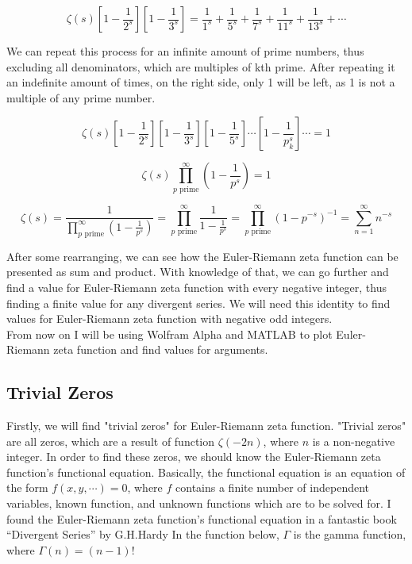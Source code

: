 \documentclass[a4paper]{article}
\begin{document}
\begin{equation*}
  \zeta(s)[1-\frac{1}{2^s}][1-\frac{1}{3^s}] = \frac{1}{1^s}+\frac{1}{5^s}+\frac{1}{7^s}+
  \frac{1}{11^s}+\frac{1}{13^s}+\cdots
  \end{equation*}

We can repeat this process for an infinite amount of prime numbers, thus
excluding all denominators, which are multiples of kth prime. After repeating it
an indefinite amount of times, on the right side, only 1 will be left, as 1 is
not a multiple of any prime number. 

\begin{equation*}
  \zeta(s)[1-\frac{1}{2^s}][1-\frac{1}{3^s}][1-\frac{1}{5^s}]\cdots[1-\frac{1}{p_k^s}]\cdots=1
  \end{equation*}

\begin{equation*}
    \zeta(s)\prod_{p \text{ prime}}^{\infty} (1-\frac{1}{p^s})=1
\end{equation*}

\begin{equation*}
  \zeta(s)=\frac{1}{\prod_{p \text{ prime}}^{\infty} (1-\frac{1}{p^s})}=\prod_{p \text{ prime}}^{\infty} \frac{1}{1-\frac{1}{p^s}}=
  \prod_{p \text{ prime}}^{\infty} (1-p^{-s})^{-1}=\sum_{n=1}^{\infty} n^{-s}
  \end{equation*}

After some rearranging, we can see how the Euler-Riemann zeta function can be
presented as sum and product. With knowledge of that, we can go further and find
a value for Euler-Riemann zeta function with every negative integer, thus
finding a finite value for any divergent series. We will need this identity to
find values for Euler-Riemann zeta function with negative odd integers.\\

From now on I will be using Wolfram Alpha and MATLAB to plot Euler-Riemann zeta
function and find values for arguments.\\

\subsection{Trivial Zeros}
\label{sec:org039a8be}

Firstly, we will find "trivial zeros" for Euler-Riemann zeta function. "Trivial
zeros" are all zeros, which are a result of function \(\zeta(-2n)\), where \(n\) is
a non-negative integer. In order to find these zeros, we should know the
Euler-Riemann zeta function's functional equation. Basically, the functional
equation \cite{Func} is an equation of the form \(f(x, y, \cdots ) = 0\), where \(f\)
contains a finite number of independent variables, known function, and unknown
functions which are to be solved for. I found the Euler-Riemann zeta function's
functional equation in a fantastic book “Divergent Series” by
G.H.Hardy \cite{Hardy} In the function below, \(\Gamma\) is the gamma function,
where \(\Gamma(n) = (n-1)!\) 
\end{document}
